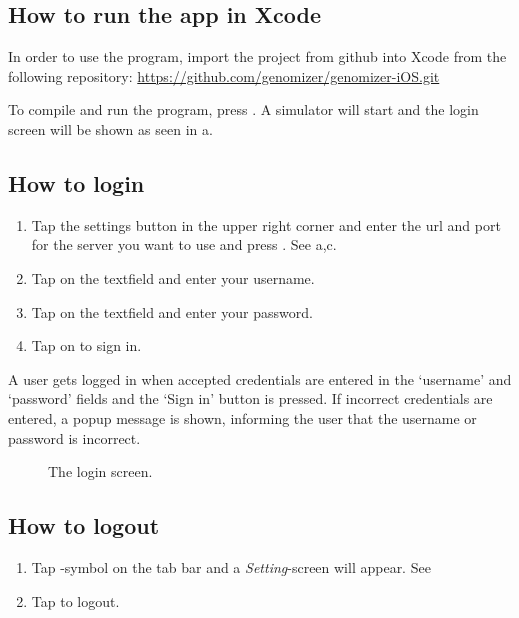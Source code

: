 \subsection{How to run the app in Xcode}
In order to use the program, import the project from github into Xcode from the following repository:
\url{https://github.com/genomizer/genomizer-iOS.git} 

To compile and run the program, press . A simulator will start and the login screen will be shown as seen in a.

\subsection{How to login}

\begin{enumerate}
\item Tap the settings button in the upper right corner and enter the url and port for the server you want to use and press . See a,c.
\item Tap on the  textfield and enter your username.
\item Tap on the  textfield and enter your password.
\item Tap on  to sign in.
\end{enumerate}
A user gets logged in when accepted credentials are entered in the ‘username’ and ‘password’ fields and the ‘Sign in’ button is pressed. If incorrect credentials are entered, a popup message is shown, informing the user that the username or password is incorrect.

\begin{figure}[ht]
\caption{The login screen.}
\label{fig:ios_login}
\end{figure}
\FloatBarrier

\subsection{How to logout}
\begin{enumerate}
\item Tap -symbol on the tab bar and a \emph{Setting}-screen will appear. See 
\item Tap  to logout.
\end{enumerate}

